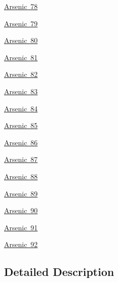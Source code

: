\begin{DoxyCompactItemize}
\item 
\mbox{\hyperlink{group___isotope_const-_arsenic-_as78}{Arsenic 78}}
\item 
\mbox{\hyperlink{group___isotope_const-_arsenic-_as79}{Arsenic 79}}
\item 
\mbox{\hyperlink{group___isotope_const-_arsenic-_as80}{Arsenic 80}}
\item 
\mbox{\hyperlink{group___isotope_const-_arsenic-_as81}{Arsenic 81}}
\item 
\mbox{\hyperlink{group___isotope_const-_arsenic-_as82}{Arsenic 82}}
\item 
\mbox{\hyperlink{group___isotope_const-_arsenic-_as83}{Arsenic 83}}
\item 
\mbox{\hyperlink{group___isotope_const-_arsenic-_as84}{Arsenic 84}}
\item 
\mbox{\hyperlink{group___isotope_const-_arsenic-_as85}{Arsenic 85}}
\item 
\mbox{\hyperlink{group___isotope_const-_arsenic-_as86}{Arsenic 86}}
\item 
\mbox{\hyperlink{group___isotope_const-_arsenic-_as87}{Arsenic 87}}
\item 
\mbox{\hyperlink{group___isotope_const-_arsenic-_as88}{Arsenic 88}}
\item 
\mbox{\hyperlink{group___isotope_const-_arsenic-_as89}{Arsenic 89}}
\item 
\mbox{\hyperlink{group___isotope_const-_arsenic-_as90}{Arsenic 90}}
\item 
\mbox{\hyperlink{group___isotope_const-_arsenic-_as91}{Arsenic 91}}
\item 
\mbox{\hyperlink{group___isotope_const-_arsenic-_as92}{Arsenic 92}}
\end{DoxyCompactItemize}


\subsection{Detailed Description}
